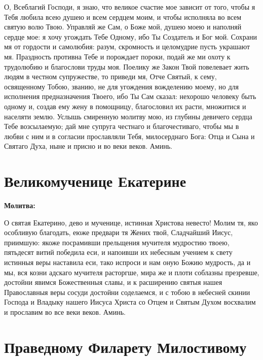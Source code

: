 О, Всеблагий Господи, я знаю, что великое счастие мое зависит от того, чтобы я Тебя любила всею душею и всем сердцем моим, и чтобы исполняла во всем святую волю Твою. Управляй же Сам, о Боже мой, душею моею и наполняй сердце мое: я хочу угождать Тебе Одному, ибо Ты Создатель и Бог мой. Сохрани мя от гордости и самолюбия: разум, скромность и целомудрие пусть украшают мя. Праздность противна Тебе и порождает пороки, подай же ми охоту к трудолюбию и благослови труды моя. Поелику же Закон Твой повелевает жить людям в честном супружестве, то приведи мя, Отче Святый, к сему, освященному Тобою, званию, не для угождения вожделению моему, но для исполнения предназначения Твоего, ибо Ты Сам сказал: нехорошо человеку быть одному и, создав ему жену в помощницу, благословил их расти, множитися и населяти землю. Услышь смиренную молитву мою, из глубины девичего сердца Тебе возсылаемую; дай мне супруга честнаго и благочестиваго, чтобы мы в любви с ним и в согласии прославляли Тебя, милосерднаго Бога: Отца и Сына и Святаго Духа, ныне и присно и во веки веков. Аминь.


\newpage{}\section{Великомученице Екатерине}
 
\bfseries Молитва:\normalfont{}\nopagebreak


О святая Екатерино, дево и мученице, истинная Христова невесто! Молим тя, яко особливую благодать, еюже предвари тя Жених твой, Сладчайший Иисус, приимшую: якоже посрамивши прельщения мучителя мудростию твоею, пятьдесят витий победила еси, и напоивши их небесным учением к свету истинныя веры наставила еси, тако испроси и нам оную Божию мудрость, да и мы, вся козни адскаго мучителя расторгше, мира же и плоти соблазны презревше, достойни явимся Божественныя славы, и к расширению святыя нашея Православныя веры сосуди достойни соделаемся, и с тобою в небесней скинии Господа и Владыку нашего Иисуса Христа со Отцем и Святым Духом восхвалим и прославим во все веки веков. Аминь.

 





\section{Праведному Филарету Милостивому}
 

